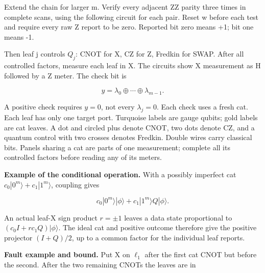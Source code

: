 \documentclass[11pt]{article}
\begin{document}
\begin{center}\begin{minipage}{\linewidth}

\end{minipage}\end{center}

Extend the chain for larger m. Verify every adjacent ZZ parity three times in complete scans, using the following circuit for each pair. Reset w before each test and require every raw Z report to be zero. Reported bit zero means +1; bit one means -1.

\begin{center}\begin{minipage}{\linewidth}

\end{minipage}\end{center}

Then leaf j controls \(Q_j\): CNOT for X, CZ for Z, Fredkin for SWAP. After all controlled factors, measure each leaf in X. The circuits show X measurement as H followed by a Z meter. The check bit is

\[
y=\lambda_0\oplus\cdots\oplus\lambda_{m-1}.
\]

A positive check requires \(y=0\), not every \(\lambda_j=0\). Each check uses a fresh cat. Each leaf has only one target port. Turquoise labels are gauge qubits; gold labels are cat leaves. A dot and circled plus denote CNOT, two dots denote CZ, and a quantum control with two crosses denotes Fredkin. Double wires carry classical bits. Panels sharing a cat are parts of one measurement; complete all its controlled factors before reading any of its meters.

\textbf{Example of the conditional operation.} With a possibly imperfect cat \(c_0|0^m\rangle+c_1|1^m\rangle\), coupling gives

\[
c_0|0^m\rangle|\phi\rangle+c_1|1^m\rangle Q|\phi\rangle.
\]

An actual leaf-X sign product \(r=\pm1\) leaves a data state proportional to \((c_0I+r c_1Q)|\phi\rangle\). The ideal cat and positive outcome therefore give the positive projector \((I+Q)/2\), up to a common factor for the individual leaf reports.

\textbf{Fault example and bound.} Put X on \(\ell_1\) after the first cat CNOT but before the second. After the two remaining CNOTs the leaves are in
\end{document}
